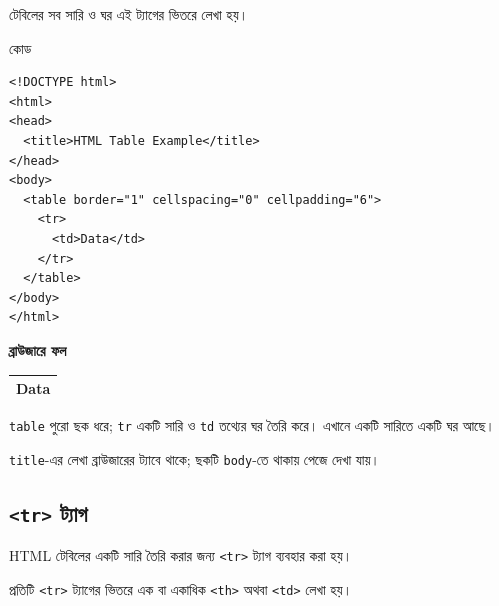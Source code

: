 টেবিলের সব সারি ও ঘর এই ট্যাগের ভিতরে লেখা হয়।

\par\noindent
\begin{minipage}[t]{.52\linewidth}\vspace{0pt}\small
\begin{chFourWholeExample}{কোড}
\begin{verbatim}
<!DOCTYPE html>
<html>
<head>
  <title>HTML Table Example</title>
</head>
<body>
  <table border="1" cellspacing="0" cellpadding="6">
    <tr>
      <td>Data</td>
    </tr>
  </table>
</body>
</html>
\end{verbatim}
\end{chFourWholeExample}
\end{minipage}\hfill
\begin{minipage}[t]{.44\linewidth}\vspace{0pt}\small
\textbf{\color{chFourTeal}ব্রাউজারে ফল}\par
\begin{tabular}{|l|}\hline Data \\\hline\end{tabular}\par\smallskip
\texttt{table} পুরো ছক ধরে; \texttt{tr} একটি সারি ও \texttt{td} তথ্যের ঘর তৈরি করে। এখানে একটি সারিতে একটি ঘর আছে।\par
\texttt{title}-এর লেখা ব্রাউজারের ট্যাবে থাকে; ছকটি \texttt{body}-তে থাকায় পেজে দেখা যায়।
\end{minipage}\par\smallskip


\subsection{\texttt{<tr>} ট্যাগ}

\begin{definitionbox}{}
HTML টেবিলের একটি সারি তৈরি করার জন্য \texttt{<tr>} ট্যাগ ব্যবহার করা হয়।
\end{definitionbox}

প্রতিটি \texttt{<tr>} ট্যাগের ভিতরে এক বা একাধিক \texttt{<th>} অথবা \texttt{<td>} লেখা হয়।

